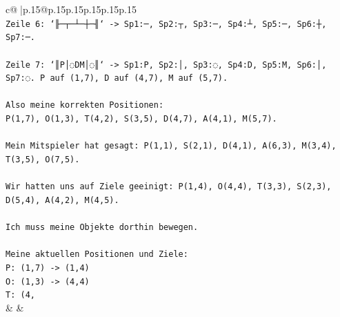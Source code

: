 \documentclass{article}
\begin{document}
{\begin{supertabular}{c@{$\;$}|p{.15\linewidth}@{}p{.15\linewidth}p{.15\linewidth}p{.15\linewidth}p{.15\linewidth}p{.15\linewidth}}
{{{\\ 
\texttt{Zeile 6: `╟─┬─┴─┼─╢` {-}> Sp1:─, Sp2:┬, Sp3:─, Sp4:┴, Sp5:─, Sp6:┼, Sp7:─.} \\
\\ 
\texttt{Zeile 7: `║P│◌DM│◌║` {-}> Sp1:P, Sp2:│, Sp3:◌, Sp4:D, Sp5:M, Sp6:│, Sp7:◌. P auf (1,7), D auf (4,7), M auf (5,7).} \\
\\ 
\texttt{Also meine korrekten Positionen: } \\
\texttt{P(1,7), O(1,3), T(4,2), S(3,5), D(4,7), A(4,1), M(5,7).} \\
\\ 
\texttt{Mein Mitspieler hat gesagt: P(1,1), S(2,1), D(4,1), A(6,3), M(3,4), T(3,5), O(7,5).} \\
\\ 
\texttt{Wir hatten uns auf Ziele geeinigt: P(1,4), O(4,4), T(3,3), S(2,3), D(5,4), A(4,2), M(4,5).} \\
\\ 
\texttt{Ich muss meine Objekte dorthin bewegen.} \\
\\ 
\texttt{Meine aktuellen Positionen und Ziele:} \\
\texttt{P: (1,7) {-}> (1,4)} \\
\texttt{O: (1,3) {-}> (4,4)} \\
\texttt{T: (4,} \\
            }
        }
    }
    & & \\ \\


\end{supertabular}}
\end{document}
